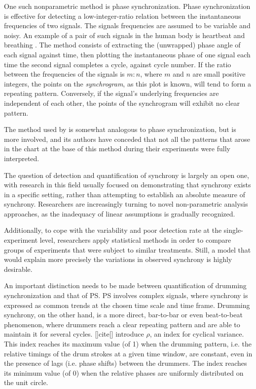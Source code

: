 \documentclass[a4paper, 11pt]{report}      %
\begin{document}
One such nonparametric method is phase synchronization. Phase synchronization is effective for detecting a low-integer-ratio relation between the instantaneous frequencies of two signals. The signals frequencies are assumed to be variable and noisy. An example of a pair of such signals in the human body is heartbeat and breathing \citep{schafer1998heartbeat}. The method consists of extracting the (unwrapped) phase angle of each signal against time, then plotting the instantaneous phase of one signal each time the second signal completes a cycle, against cycle number. If the ratio between the frequencies of the signals is $m:n$, where $m$ and $n$ are small positive integers, the points on the \emph{synchrogram}, as this plot is known, will tend to form a repeating pattern. Conversely, if the signal's underlying frequencies are independent of each other, the points of the synchrogram will exhibit no clear pattern.

The method used by \cite{wallot2016multidimensional} is somewhat analogous to phase synchronization, but is more involved, and its authors have conceded that not all the patterns that arose in the chart at the base of this method during their experiments were fully interpreted.

The question of detection and quantification of synchrony is largely an open one, with research in this field usually focused on demonstrating that synchrony exists in a specific setting, rather than attempting to establish an absolute measure of synchrony. Researchers are increasingly turning to novel non-parametric analysis approaches, as the inadequacy of linear assumptions is gradually recognized. 

Additionally, to cope with the variability and poor detection rate at the single-experiment level, researchers apply statistical methods in order to compare groups of experiments that were subject to similar treatments. Still, a model that would explain more precisely the variations in observed synchrony is highly desirable.   


An important distinction needs to be made between quantification of drumming synchronization and that of PS. PS involves complex signals, where synchrony is expressed as common trends at the chosen time scale and time frame. Drumming synchrony, on the other hand, is a more direct, bar-to-bar or even beat-to-beat phenomenon, where drummers reach a clear repeating pattern and are able to maintain it for several cycles. []cite[] introduce $\rho$, an index for cyclical variance. This index reaches its maximum value (of 1) when the drumming pattern, i.e. the relative timings of the drum strokes at a given time window, are constant, even in the presence of lags (i.e. phase shifts) between the drummers. The index reaches its minimum value (of 0) when the relative phases are uniformly distributed on the unit circle.
\end{document}
